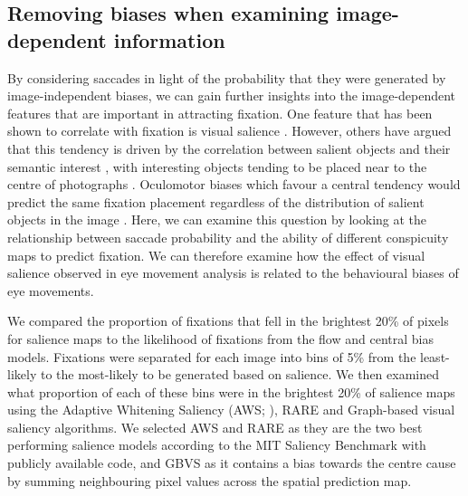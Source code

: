 \subsection{Removing biases when examining image-dependent information}

By considering saccades in light of the probability that they were generated by image-independent biases, we can gain further insights into the image-dependent features that are important in attracting fixation. One feature that has been shown to correlate with fixation is visual salience \citep{parkhurst2002}. However, others have argued that this tendency is driven by the correlation between salient objects and their semantic interest \citep{henderson2007}, with interesting objects tending to be placed near to the centre of photographs \citep{tatler2007}. Oculomotor biases which favour a central tendency would predict the same fixation placement regardless of the distribution of salient objects in the image \citep{tatler-vincent2009}. Here, we can examine this question by looking at the relationship between saccade probability and the ability of different conspicuity maps to predict fixation. We can therefore examine how the effect of visual salience observed in eye movement analysis is related to the behavioural biases of eye movements.

We compared the proportion of fixations that fell in the brightest 20\% of pixels for salience maps to the likelihood of fixations from the flow and central bias models. Fixations were separated for each image into bins of 5\% from the least-likely to the most-likely to be generated based on salience. We then examined what proportion of each of these bins were in the brightest 20\% of salience maps using the Adaptive Whitening Saliency (AWS; \cite{garciadiaz2012}), RARE \citep{riche2013} and Graph-based visual saliency \citep[GBVS;][]{harel2006} algorithms. We selected AWS and RARE as they are the two best performing salience models according to the MIT Saliency Benchmark \citep{mit-saliency-benchmark,judd2012} with publicly available code, and GBVS as it contains a bias towards the centre cause by summing neighbouring pixel values across the spatial prediction map.


